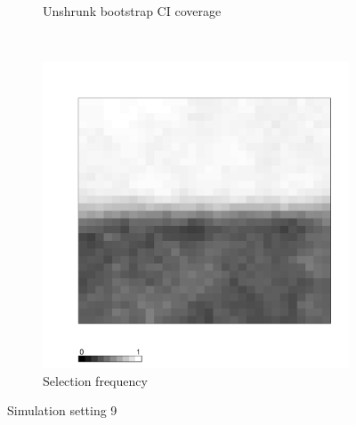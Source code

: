 \documentclass[authoryear, review, 11pt]{elsarticle}
\begin{document}
\begin{figure}
\begin{subfigure}[b]{0.45\textwidth}
		\caption{Unshrunk bootstrap CI coverage}
	\end{subfigure}%
	~ %
	\begin{subfigure}[b]{0.45\textwidth}
	\centering
		\includegraphics[width=\textwidth]{../../figures/simulation/X1.15.9.selection.pdf}
		\caption{Selection frequency}
	\end{subfigure}
	\caption{Simulation setting 9}
\end{figure}

\clearpage
\end{document}
